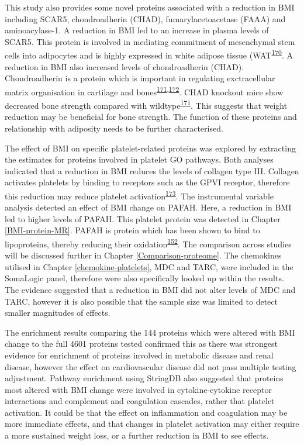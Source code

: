 \documentclass[11pt,twoside]{bristolthesis}
\begin{document}
This study also provides some novel proteins associated with a reduction in BMI including SCAR5, chondroadherin (CHAD), fumarylacetoacetase (FAAA) and aminoacylase-1. A reduction in BMI led to an increase in plasma levels of SCAR5. This protein is involved in mediating commitment of mesenchymal stem cells into adipocytes and is highly expressed in white adipose tissue (WAT\textsuperscript{\protect\hyperlink{ref-Lee2017a}{170}}. A reduction in BMI also increased levels of chondroadherin (CHAD). Chondroadherin is a protein which is important in regulating exctracellular matrix organisation in cartilage and bones\textsuperscript{\protect\hyperlink{ref-Hessle2013}{171},\protect\hyperlink{ref-Iozzo2015}{172}}. CHAD knockout mice show decreased bone strength compared with wildtype\textsuperscript{\protect\hyperlink{ref-Hessle2013}{171}}. This suggests that weight reduction may be beneficial for bone strength. The function of these proteins and relationship with adiposity needs to be further characterised.

The effect of BMI on specific platelet-related proteins was explored by extracting the estimates for proteins involved in platelet GO pathways. Both analyses indicated that a reduction in BMI reduces the levels of collagen type III. Collagen activates platelets by binding to receptors such as the GPVI receptor, therefore this reduction may reduce platelet activation\textsuperscript{\protect\hyperlink{ref-Maurice2006}{173}}. The instrumental variable analysis detected an effect of BMI change on PAFAH. Here, a reduction in BMI led to higher levels of PAFAH. This platelet protein was detected in Chapter \ref{BMI-protein-MR}. PAFAH is protein which has been shown to bind to lipoproteins, thereby reducing their oxidation\textsuperscript{\protect\hyperlink{ref-Noto2003}{152}}. The comparison across studies will be discussed further in Chapter \ref{Comparison-proteome}. The chemokines utilised in Chapter \ref{chemokine-platelets}, MDC and TARC, were included in the SomaLogic panel, therefore were also specifically looked up within the results. The evidence suggested that a reduction in BMI did not alter levels of MDC and TARC, however it is also possible that the sample size was limited to detect smaller magnitudes of effects.

The enrichment results comparing the 144 proteins which were altered with BMI change to the full 4601 proteins tested confirmed this as there was strongest evidence for enrichment of proteins involved in metabolic disease and renal disease, however the effect on cardiovascular disease did not pass multiple testing adjustment. Pathway enrichment using StringDB also suggested that proteins most altered with BMI change were involved in cytokine-cytokine receptor interactions and complement and coagulation cascades, rather that platelet activation. It could be that the effect on inflammation and coagulation may be more immediate effects, and that changes in platelet activation may either require a more sustained weight loss, or a further reduction in BMI to see effects.
\end{document}

